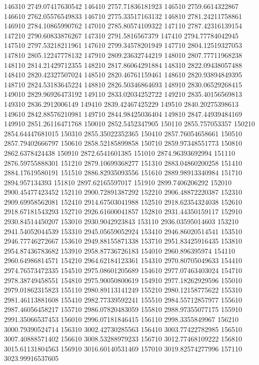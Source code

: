 {146310 2749.07417630542
146410 2757.71836181923
146510 2759.6614322867
146610 2762.05576549833
146710 2775.33517163132
146810 2781.24211758861
146910 2784.10865990762
147010 2785.80574109322
147110 2787.42316139154
147210 2790.60833876267
147310 2791.5816567379
147410 2794.77784042945
147510 2797.53218211961
147610 2799.34578201949
147710 2804.12519327053
147810 2805.12247778132
147910 2809.23632744219
148010 2807.77711968238
148110 2814.21429712355
148210 2817.86064291884
148310 2822.09438057488
148410 2820.42327507024
148510 2820.46761159461
148610 2820.93894849395
148710 2824.53183645224
148810 2826.50346864693
148910 2830.06529268415
149010 2829.96926473192
149110 2833.02034252722
149210 2835.40156569813
149310 2836.2912006149
149410 2839.42467425229
149510 2840.20275398613
149610 2842.88576210981
149710 2844.98425036404
149810 2847.44939484169
149910 2851.26116471768
150010 2852.5452347905
150110 2855.757053357
150210 2854.64447681015
150310 2855.35022352365
150410 2857.76054658661
150510 2857.79402666797
150610 2858.52185899858
150710 2859.97348551773
150810 2862.6378424438
150910 2872.6541601385
151010 2874.96393692994
151110 2876.59755888301
151210 2879.10699368277
151310 2883.04860200258
151410 2884.17619580191
151510 2886.82935093556
151610 2889.98913340984
151710 2894.957134393
151810 2897.62165597017
151910 2899.7406206292
152010 2900.45477423452
152110 2900.72891387292
152210 2906.48872220387
152310 2909.69958562081
152410 2914.67503041988
152510 2918.62354324038
152610 2918.67181543293
152710 2926.61600041857
152810 2931.44350159117
152910 2930.84514450207
153010 2930.9042923843
153110 2936.03595014603
153210 2941.54052044539
153310 2945.05659052924
153410 2946.86020514541
153510 2946.77746272667
153610 2949.88155871338
153710 2951.83425916435
153810 2954.87436783682
153910 2958.87736726183
154010 2960.896395974
154110 2960.64986814571
154210 2964.62184123361
154310 2970.80705049633
154410 2974.76573472335
154510 2975.08601205689
154610 2977.07463403024
154710 2978.38749458551
154810 2975.90050800619
154910 2977.18262929596
155010 2979.01862315823
155110 2980.89113141249
155210 2980.12158775622
155310 2981.46113881608
155410 2982.77339592241
155510 2984.55712857977
155610 2987.46056458217
155710 2986.07820483059
155810 2988.97355077175
155910 2991.35066537453
156010 2996.07181846415
156110 2998.3355849967
156210 3000.79390524714
156310 3002.42730285563
156410 3003.77422782985
156510 3007.40888571402
156610 3008.53288979233
156710 3012.77468109222
156810 3015.61131804563
156910 3016.60140531469
157010 3019.82574277996
157110 3023.99916537605
}
